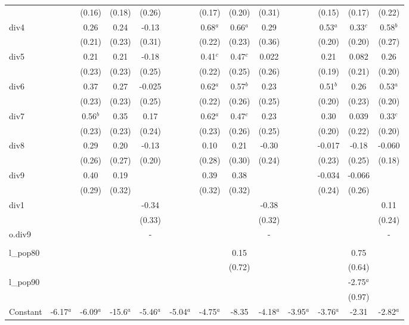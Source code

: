 \documentclass[]{article}
\begin{document}
\begin{tabular}{lcccccccccccc}
 &  & (0.16) & (0.18) & (0.26) &  & (0.17) & (0.20) & (0.31) &  & (0.15) & (0.17) & (0.22) \\
div4 &  & 0.26 & 0.24 & -0.13 &  & 0.68$^a$ & 0.66$^a$ & 0.29 &  & 0.53$^a$ & 0.33$^c$ & 0.58$^b$ \\
 &  & (0.21) & (0.23) & (0.31) &  & (0.22) & (0.23) & (0.36) &  & (0.20) & (0.20) & (0.27) \\
div5 &  & 0.21 & 0.21 & -0.18 &  & 0.41$^c$ & 0.47$^c$ & 0.022 &  & 0.21 & 0.082 & 0.26 \\
 &  & (0.23) & (0.23) & (0.25) &  & (0.22) & (0.25) & (0.26) &  & (0.19) & (0.21) & (0.20) \\
div6 &  & 0.37 & 0.27 & -0.025 &  & 0.62$^a$ & 0.57$^b$ & 0.23 &  & 0.51$^b$ & 0.26 & 0.53$^a$ \\
 &  & (0.23) & (0.23) & (0.25) &  & (0.22) & (0.26) & (0.25) &  & (0.20) & (0.23) & (0.20) \\
div7 &  & 0.56$^b$ & 0.35 & 0.17 &  & 0.62$^a$ & 0.47$^c$ & 0.23 &  & 0.30 & 0.039 & 0.33$^c$ \\
 &  & (0.23) & (0.23) & (0.24) &  & (0.23) & (0.26) & (0.25) &  & (0.20) & (0.22) & (0.20) \\
div8 &  & 0.29 & 0.20 & -0.13 &  & 0.10 & 0.21 & -0.30 &  & -0.017 & -0.18 & -0.060 \\
 &  & (0.26) & (0.27) & (0.20) &  & (0.28) & (0.30) & (0.24) &  & (0.23) & (0.25) & (0.18) \\
div9 &  & 0.40 & 0.19 &  &  & 0.39 & 0.38 &  &  & -0.034 & -0.066 &  \\
 &  & (0.29) & (0.32) &  &  & (0.32) & (0.32) &  &  & (0.24) & (0.26) &  \\
div1 &  &  &  & -0.34 &  &  &  & -0.38 &  &  &  & 0.11 \\
 &  &  &  & (0.33) &  &  &  & (0.32) &  &  &  & (0.24) \\
o.div9 &  &  &  & - &  &  &  & - &  &  &  & - \\
 &  &  &  &  &  &  &  &  &  &  &  &  \\
l\_pop80 &  &  &  &  &  &  & 0.15 &  &  &  & 0.75 &  \\
 &  &  &  &  &  &  & (0.72) &  &  &  & (0.64) &  \\
l\_pop90 &  &  &  &  &  &  &  &  &  &  & -2.75$^a$ &  \\
 &  &  &  &  &  &  &  &  &  &  & (0.97) &  \\
Constant & -6.17$^a$ & -6.09$^a$ & -15.6$^a$ & -5.46$^a$ & -5.04$^a$ & -4.75$^a$ & -8.35 & -4.18$^a$ & -3.95$^a$ & -3.76$^a$ & -2.31 & -2.82$^a$ \\

\end{tabular}
\end{document}
